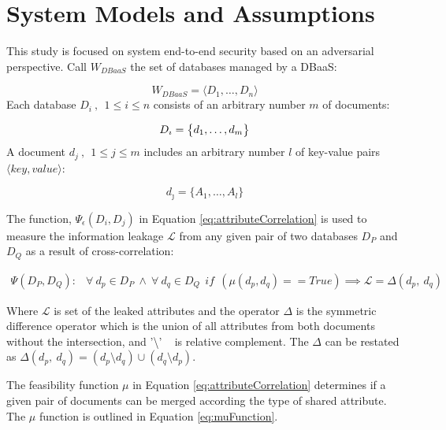 \section{System Models and Assumptions}
\label{sec:systemModel}
 This study is focused on system end-to-end security based on an adversarial perspective.  Call  $W_{DBaaS}$ the set of databases managed by a DBaaS:

\begin{equation}
\label{eq:DBaaS}
W_{DBaaS}=\Big \langle D_1,\dots, D_n \Big \rangle
\end{equation}
Each database $D_{i} ~, ~~ 1 \le i \le n$ consists  of an arbitrary number  $m$ of documents:

\begin{equation}
\label{eq:Database}
D_\imath = \big\{ d_1,\dots,d_m\big\}\\
\end{equation}
A document $d_{j}~,~~1 \le  j \le m$ includes an arbitrary number $l$ of key-value pairs $\langle key, value\rangle$: 

\begin{equation}
\label{eq:Document}
d_\jmath=\big\{ A_1,\dots, A_l\big\} 
\end{equation}

\noindent The function, $\Psi_{\epsilon}(D_i,D_j)$ in Equation \ref{eq:attributeCorrelation} is used to measure the information leakage $\mathcal{L}$ from any given pair of two databases $D_P$ and $D_Q$ as a result of cross-correlation:   

\begin{equation}
\label{eq:attributeCorrelation}
\begin{aligned}
\Psi (D_P, D_Q):
& \forall~d_p \in D_P ~\land~ \forall~ d_q \in D_Q ~~if~~ (\mu(d_p,d_q)==True) \implies \mathcal{L}=\Delta(d_p, ~d_q) 
\end{aligned}
\end{equation}

Where $\mathcal{L}$ is set of the leaked attributes and the operator $\Delta$ is the symmetric difference operator which is the union of all attributes from both documents without the intersection, and '\textbackslash' ~ is relative complement. The $\Delta$ can be restated as $\Delta(d_p, ~d_q) =(d_p\setminus d_q)\cup (d_q\setminus d_p)$.

\noindent The feasibility function $\mu$ in Equation \ref{eq:attributeCorrelation} determines if a given pair of documents can be merged according the type of shared attribute. The $\mu$ function is outlined in Equation \ref{eq:muFunction}.


